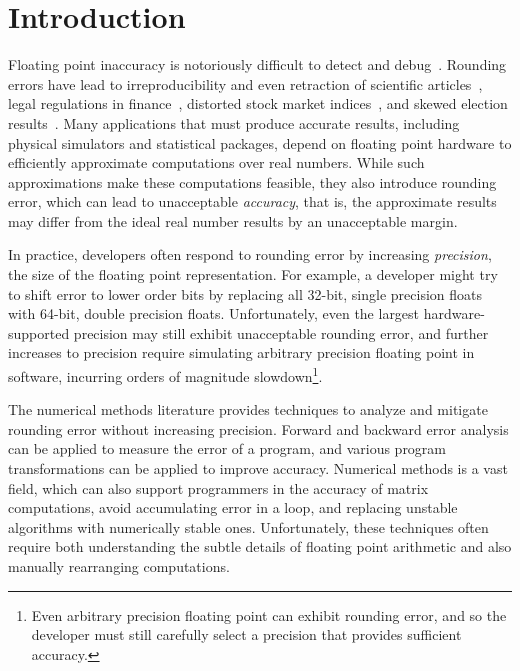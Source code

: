 \documentclass[paper.tex]{subfiles}
\begin{document}
\section{Introduction}
\label{sec:introduction}

Floating point inaccuracy is notoriously difficult to detect and
debug~\cite{berkeley00-needle-like, kahan-java-hurts}.  Rounding
errors have lead to irreproducibility and even retraction of
scientific articles~\cite{num-issues-in-stat, num-replication,
  stat-robustness}, legal regulations in finance~\cite{euro-rounding},
distorted stock market indices~\cite{distort-stock,
  wall-street-distort-stock}, and skewed election
results~\cite{round-elections}.  Many applications that must produce
accurate results, including physical simulators and statistical
packages, depend on floating point hardware to efficiently approximate
computations over real numbers.  While such approximations make these
computations feasible, they also introduce rounding error, which can
lead to unacceptable \textit{accuracy}, that is, the approximate
results may differ from the ideal real number results by an
unacceptable margin.


In practice, developers often respond to rounding error by increasing
\textit{precision}, the size of the floating point representation.
For example, a developer might try to shift error to lower order bits
by replacing all 32-bit, single precision floats with 64-bit, double
precision floats.  Unfortunately, even the largest hardware-supported
precision may still exhibit unacceptable rounding error, and further
increases to precision require simulating arbitrary precision floating
point in software, incurring orders of magnitude
slowdown\footnote{Even arbitrary precision floating point can exhibit
  rounding error, and so the developer must still carefully select a
  precision that provides sufficient accuracy.}.

The numerical methods literature provides techniques to analyze and
mitigate rounding error without increasing precision.  Forward and
backward error analysis  can be applied to measure the
error of a program, and various program transformations 
can be applied to improve accuracy.  Numerical methods is a vast
field, which can also support programmers in the accuracy of matrix
computations, avoid accumulating error in a loop, and replacing
unstable algorithms with numerically stable ones.  Unfortunately,
these techniques often require both understanding the subtle details
of floating point arithmetic and also manually rearranging
computations.
\end{document}
